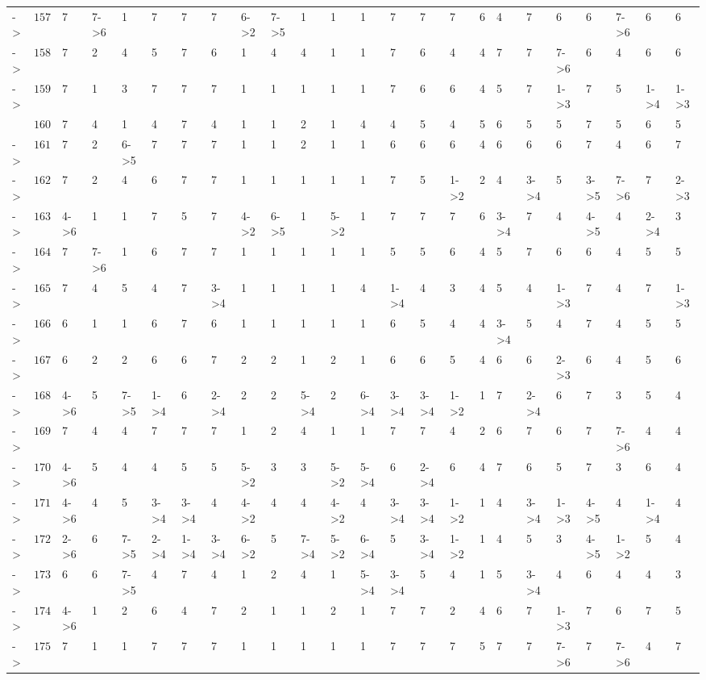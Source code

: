\documentclass[6pt]{article}
\begin{document}
\begin{landscape}
{\begin{longtable}{lrllllllllllllllllllllll}
-\textgreater &$157$&7&7-\textgreater 6&1&7&7&7&6-\textgreater 2&7-\textgreater 5&1&1&1&7&7&7&6&4&7&6&6&7-\textgreater 6&6&6\tabularnewline
-\textgreater &$158$&7&2&4&5&7&6&1&4&4&1&1&7&6&4&4&7&7&7-\textgreater 6&6&4&6&6\tabularnewline
-\textgreater &$159$&7&1&3&7&7&7&1&1&1&1&1&7&6&6&4&5&7&1-\textgreater 3&7&5&1-\textgreater 4&1-\textgreater 3\tabularnewline
&$160$&7&4&1&4&7&4&1&1&2&1&4&4&5&4&5&6&5&5&7&5&6&5\tabularnewline
-\textgreater &$161$&7&2&6-\textgreater 5&7&7&7&1&1&2&1&1&6&6&6&4&6&6&6&7&4&6&7\tabularnewline
-\textgreater &$162$&7&2&4&6&7&7&1&1&1&1&1&7&5&1-\textgreater 2&2&4&3-\textgreater 4&5&3-\textgreater 5&7-\textgreater 6&7&2-\textgreater 3\tabularnewline
-\textgreater &$163$&4-\textgreater 6&1&1&7&5&7&4-\textgreater 2&6-\textgreater 5&1&5-\textgreater 2&1&7&7&7&6&3-\textgreater 4&7&4&4-\textgreater 5&4&2-\textgreater 4&3\tabularnewline
-\textgreater &$164$&7&7-\textgreater 6&1&6&7&7&1&1&1&1&1&5&5&6&4&5&7&6&6&4&5&5\tabularnewline
-\textgreater &$165$&7&4&5&4&7&3-\textgreater 4&1&1&1&1&4&1-\textgreater 4&4&3&4&5&4&1-\textgreater 3&7&4&7&1-\textgreater 3\tabularnewline
-\textgreater &$166$&6&1&1&6&7&6&1&1&1&1&1&6&5&4&4&3-\textgreater 4&5&4&7&4&5&5\tabularnewline
-\textgreater &$167$&6&2&2&6&6&7&2&2&1&2&1&6&6&5&4&6&6&2-\textgreater 3&6&4&5&6\tabularnewline
-\textgreater &$168$&4-\textgreater 6&5&7-\textgreater 5&1-\textgreater 4&6&2-\textgreater 4&2&2&5-\textgreater 4&2&6-\textgreater 4&3-\textgreater 4&3-\textgreater 4&1-\textgreater 2&1&7&2-\textgreater 4&6&7&3&5&4\tabularnewline
-\textgreater &$169$&7&4&4&7&7&7&1&2&4&1&1&7&7&4&2&6&7&6&7&7-\textgreater 6&4&4\tabularnewline
-\textgreater &$170$&4-\textgreater 6&5&4&4&5&5&5-\textgreater 2&3&3&5-\textgreater 2&5-\textgreater 4&6&2-\textgreater 4&6&4&7&6&5&7&3&6&4\tabularnewline
-\textgreater &$171$&4-\textgreater 6&4&5&3-\textgreater 4&3-\textgreater 4&4&4-\textgreater 2&4&4&4-\textgreater 2&4&3-\textgreater 4&3-\textgreater 4&1-\textgreater 2&1&4&3-\textgreater 4&1-\textgreater 3&4-\textgreater 5&4&1-\textgreater 4&4\tabularnewline
-\textgreater &$172$&2-\textgreater 6&6&7-\textgreater 5&2-\textgreater 4&1-\textgreater 4&3-\textgreater 4&6-\textgreater 2&5&7-\textgreater 4&5-\textgreater 2&6-\textgreater 4&5&3-\textgreater 4&1-\textgreater 2&1&4&5&3&4-\textgreater 5&1-\textgreater 2&5&4\tabularnewline
-\textgreater &$173$&6&6&7-\textgreater 5&4&7&4&1&2&4&1&5-\textgreater 4&3-\textgreater 4&5&4&1&5&3-\textgreater 4&4&6&4&4&3\tabularnewline
-\textgreater &$174$&4-\textgreater 6&1&2&6&4&7&2&1&1&2&1&7&7&2&4&6&7&1-\textgreater 3&7&6&7&5\tabularnewline
-\textgreater &$175$&7&1&1&7&7&7&1&1&1&1&1&7&7&7&5&7&7&7-\textgreater 6&7&7-\textgreater 6&4&7\tabularnewline

\end{longtable}}
\end{landscape}
\end{document}
